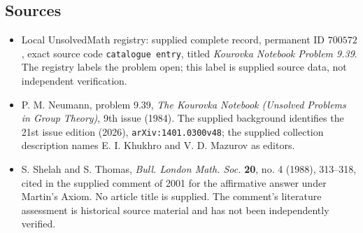 \documentclass[11pt]{article}
\begin{document}
\subsection{Sources}
\begin{itemize}
\item Local UnsolvedMath registry: supplied complete record, permanent ID \(700572\), exact source code \texttt{catalogue entry}, titled \emph{Kourovka Notebook Problem 9.39}. The registry labels the problem open; this label is supplied source data, not independent verification.
\item P. M. Neumann, problem 9.39, \emph{The Kourovka Notebook (Unsolved Problems in Group Theory)}, 9th issue (1984). The supplied background identifies the 21st issue edition (2026), \texttt{arXiv:1401.0300v48}; the supplied collection description names E. I. Khukhro and V. D. Mazurov as editors.
\item S. Shelah and S. Thomas, \emph{Bull. London Math. Soc.} \textbf{20}, no. 4 (1988), 313--318, cited in the supplied comment of 2001 for the affirmative answer under Martin's Axiom. No article title is supplied. The comment's literature assessment is historical source material and has not been independently verified.
\end{itemize}
\end{document}
